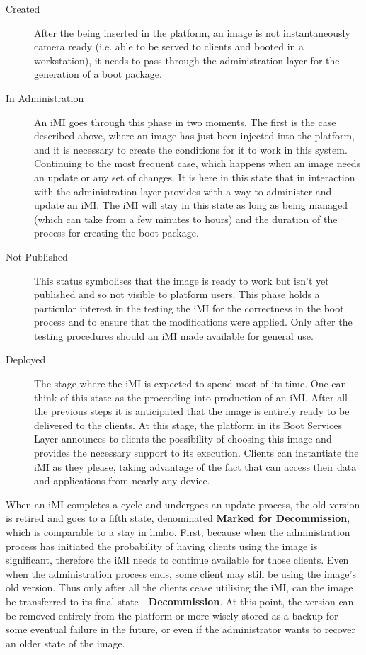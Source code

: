 \begin{description}
	\item [Created] After the being inserted in the platform, an image is not instantaneously camera ready (i.e. able to be served to clients and booted in a workstation), it needs to pass through the administration layer for the generation of a boot package. 
	\item [In Administration] An iMI goes through this phase in two moments. The first is the case described above, where an image has just been injected into the platform, and it is necessary to create the conditions for it to work in this system. Continuing to the most frequent case, which happens when an image needs an update or any set of changes. It is here in this state that in interaction with the administration layer provides with a way to administer and update an iMI. The iMI will stay in this state as long as being managed (which can take from a few minutes to hours) and the duration of the process for creating the boot package.
	\item [Not Published] This status symbolises that the image is ready to work but isn't yet published and so not visible to platform users. This phase holds a particular interest in the testing the iMI for the correctness in the boot process and to ensure that the modifications were applied. Only after the testing procedures should an iMI made available for general use.
	\item [Deployed] The stage where the iMI is expected to spend most of its time. One can think of this state as the proceeding into production of an iMI. After all the previous steps it is anticipated that the image is entirely ready to be delivered to the clients. At this stage, the platform in its Boot Services Layer announces to clients the possibility of choosing this image and provides the necessary support to its execution. Clients can instantiate the iMI as they please, taking advantage of the fact that can access their data and applications from nearly any device.
\end{description}

When an iMI completes a cycle and undergoes an update process, the old version is retired and goes to a fifth state, denominated \textbf{Marked for Decommission}, which is comparable to a stay in limbo. First, because when the administration process has initiated the probability of having clients using the image is significant, therefore the iMI needs to continue available for those clients. Even when the administration process ends, some client may still be using the image's old version. Thus only after all the clients cease utilising the iMI, can the image be transferred to its final state - \textbf{Decommission}. At this point, the version can be removed entirely from the platform or more wisely stored as a backup for some eventual failure in the future, or even if the administrator wants to recover an older state of the image.






